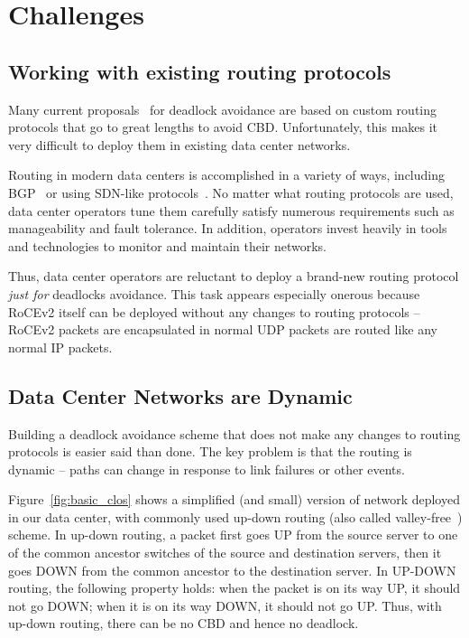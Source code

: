 \section{Challenges}
\label{sec:challenges}

\subsection{Working with existing routing protocols}
\label{sec:incremental}

Many current proposals~\cite{tcpbolt, karol2003prevention,
sancho2004,lash,wu2003fault} for deadlock avoidance are based on custom routing
protocols that go to great lengths to avoid CBD.  Unfortunately, this makes it
very difficult to deploy them in existing data center networks. 

Routing in modern data centers is accomplished in a variety of ways, including
BGP~\cite{vl2, facebookrouting} or using SDN-like
protocols~\cite{singh2015jupiter}.  No matter what routing protocols are used,
data center operators tune them carefully satisfy numerous requirements such as
manageability and fault tolerance.  In addition, operators invest heavily in
tools and technologies to monitor and maintain their networks.

Thus, data center operators are reluctant to deploy a brand-new routing protocol
{\em just for} deadlocks avoidance. This task appears especially onerous because
RoCEv2 itself can be deployed without any changes to routing protocols -- RoCEv2
packets are encapsulated in normal UDP packets are routed like any normal IP
packets.

\subsection{Data Center Networks are Dynamic}\label{sec:reroute}

Building a deadlock avoidance scheme that does not make any changes to routing
protocols is easier said than done. The key problem is that the routing is
dynamic -- paths can change in response to link failures or other events.

Figure~\ref{fig:basic_clos} shows a simplified (and small) version
of network deployed in our data center, with commonly used up-down routing (also
called valley-free~\cite{qiu2007toward}) scheme.  In up-down routing, a packet first
goes UP from the source server to one of the common ancestor switches of the
source and destination servers, then it goes DOWN from the common ancestor to
the destination server.  In UP-DOWN routing, the following property holds: when
the packet is on its way UP, it should not go DOWN; when it is on its way DOWN,
it should not go UP. Thus, with up-down routing, there can be no CBD and hence
no deadlock.

